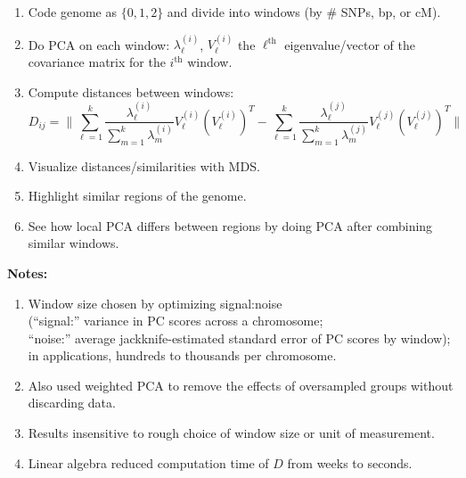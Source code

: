 \documentclass[fontscale=0.38,a0paper]{baposter}
\newcommand{\compresslist}{
\setlength{\itemsep}{1pt}
\setlength{\parskip}{0pt}
\setlength{\parsep}{0pt}
}
\begin{document}
\begin{poster}
{    \begin{enumerate}
            \compresslist
        \item Code genome as $\{0,1,2\}$ and divide into windows (by \# SNPs, bp, or cM).
        \item Do PCA on each window: $\lambda^{(i)}_\ell$, $V^{(i)}_\ell$ the $\ell^\text{th}$ eigenvalue/vector of the covariance matrix for the $i^\text{th}$ window.
        \item Compute distances between windows:
            \[  
            D_{ij} = \| 
            \sum_{\ell=1}^k \frac{\lambda^{(i)}_\ell}{\sum_{m=1}^k\lambda^{(i)}_m} V^{(i)}_\ell (V^{(i)}_\ell)^T
            -
            \sum_{\ell=1}^k \frac{\lambda^{(j)}_\ell}{\sum_{m=1}^k\lambda^{(j)}_m} V^{(j)}_\ell (V^{(j)}_\ell)^T
            \|
            \]
        \item Visualize distances/similarities with MDS.
        \item Highlight similar regions of the genome.
        \item See how local PCA differs between regions by doing PCA after combining similar windows.
    \end{enumerate}

    \textbf{Notes:}
    \begin{enumerate}
            \compresslist
        \item Window size chosen by optimizing signal:noise \\
            (``signal:'' variance in PC scores across a chromosome; \\
            ``noise:'' average jackknife-estimated standard error of PC scores by window);\\
            in applications, hundreds to thousands per chromosome.
        \item Also used weighted PCA to remove the effects of oversampled groups without discarding data.
        \item Results insensitive to rough choice of window size or unit of measurement.
        \item Linear algebra reduced computation time of $D$ from weeks to seconds.
    \end{enumerate}

}


\end{poster}
\end{document}
